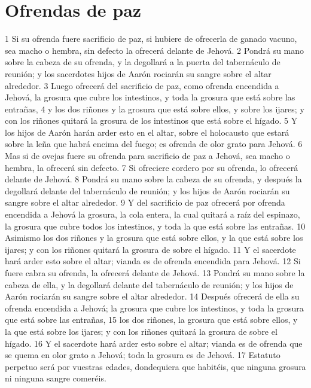 \section*{Ofrendas de paz}

1 Si su ofrenda fuere sacrificio de paz, si hubiere de ofrecerla de ganado vacuno, sea macho o hembra, sin defecto la ofrecerá delante de Jehová.
2 Pondrá su mano sobre la cabeza de su ofrenda, y la degollará a la puerta del tabernáculo de reunión; y los sacerdotes hijos de Aarón rociarán su sangre sobre el altar alrededor.
3 Luego ofrecerá del sacrificio de paz, como ofrenda encendida a Jehová, la grosura que cubre los intestinos, y toda la grosura que está sobre las entrañas,
4 y los dos riñones y la grosura que está sobre ellos, y sobre los ijares; y con los riñones quitará la grosura de los intestinos que está sobre el hígado.
5 Y los hijos de Aarón harán arder esto en el altar, sobre el holocausto que estará sobre la leña que habrá encima del fuego; es ofrenda de olor grato para Jehová.
6 Mas si de ovejas fuere su ofrenda para sacrificio de paz a Jehová, sea macho o hembra, la ofrecerá sin defecto.
7 Si ofreciere cordero por su ofrenda, lo ofrecerá delante de Jehová.
8 Pondrá su mano sobre la cabeza de su ofrenda, y después la degollará delante del tabernáculo de reunión; y los hijos de Aarón rociarán su sangre sobre el altar alrededor.
9 Y del sacrificio de paz ofrecerá por ofrenda encendida a Jehová la grosura, la cola entera, la cual quitará a raíz del espinazo, la grosura que cubre todos los intestinos, y toda la que está sobre las entrañas.
10 Asimismo los dos riñones y la grosura que está sobre ellos, y la que está sobre los ijares; y con los riñones quitará la grosura de sobre el hígado.
11 Y el sacerdote hará arder esto sobre el altar; vianda es de ofrenda encendida para Jehová.
12 Si fuere cabra su ofrenda, la ofrecerá delante de Jehová.
13 Pondrá su mano sobre la cabeza de ella, y la degollará delante del tabernáculo de reunión; y los hijos de Aarón rociarán su sangre sobre el altar alrededor.
14 Después ofrecerá de ella su ofrenda encendida a Jehová; la grosura que cubre los intestinos, y toda la grosura que está sobre las entrañas,
15 los dos riñones, la grosura que está sobre ellos, y la que está sobre los ijares; y con los riñones quitará la grosura de sobre el hígado.
16 Y el sacerdote hará arder esto sobre el altar; vianda es de ofrenda que se quema en olor grato a Jehová; toda la grosura es de Jehová.
17 Estatuto perpetuo será por vuestras edades, dondequiera que habitéis, que ninguna grosura ni ninguna sangre comeréis.

